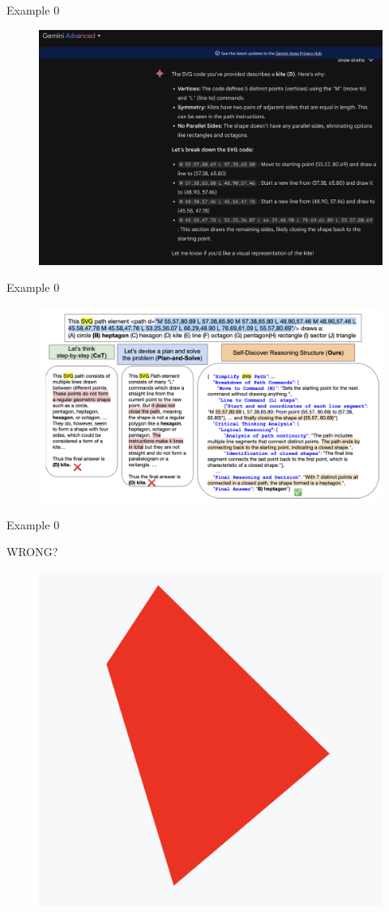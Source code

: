 \documentclass[aspectratio=169]{beamer}
\begin{document}
\begin{frame}{Example 0}
\begin{figure}
    \centering
    \includegraphics[width=0.5\linewidth]{svg_gemini.png}
\end{figure}

\end{frame}

\begin{frame}{Example 0}
\begin{figure}
    \centering
    \includegraphics[width=0.8\linewidth]{svg.png}
\end{figure}
\end{frame}

\begin{frame}{Example 0}
\begin{huge}
    WRONG?
\end{huge}
\begin{figure}
    \centering
    \includegraphics[width=0.45\linewidth]{svg_shape.png}
\end{figure}
\end{frame}
\end{document}
